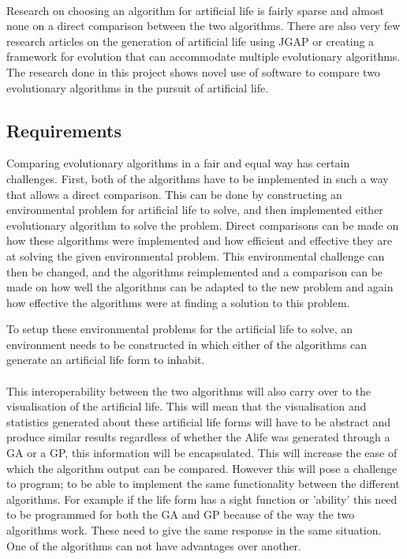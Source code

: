 \documentclass[12pt]{article}
\begin{document}
\paragraph{}
Research on choosing an algorithm for artificial life is fairly sparse and almost none on a direct comparison between the two algorithms. There are also
very few research articles on the generation of artificial life using JGAP or creating a framework for evolution that can accommodate multiple 
evolutionary algorithms. The research done in this project shows novel use of software to compare two evolutionary algorithms in the pursuit of
artificial life.

\subsection{Requirements}
Comparing evolutionary algorithms in a fair and equal way has certain challenges. First, both of the algorithms have to be implemented in such a way that allows a direct comparison. 
This can be done by constructing an environmental problem for artificial life to solve, and then implemented either evolutionary algorithm to solve the problem. Direct
comparisons can be made on how these algorithms were implemented and how efficient and effective they are at solving the given environmental problem. This
environmental challenge can then be changed, and the algorithms reimplemented and a comparison can be made on how well the algorithms can be adapted to the new
problem and again how effective the algorithms were at finding a solution to this problem.

To setup these environmental problems for the artificial life to solve, an environment needs to be constructed in which either of the algorithms can generate
an artificial life form to inhabit.

\paragraph{}
This interoperability between the two algorithms will also carry over to the visualisation of the artificial life. This will mean
that the visualisation and statistics generated about these artificial life forms will have to be abstract and produce similar results regardless of
whether the Alife was generated through a GA or a GP, this information will be encapsulated. This will increase the ease of which the algorithm output can
be compared. However this will pose a challenge to program; to be able to implement the same functionality between the 
different algorithms. For example if the life form has a sight function or 'ability' this need to be programmed for both
the GA and GP because of the way the two algorithms work. These need to give the same response in the same situation. One of the
algorithms can not have advantages over another.
	
\end{document}
